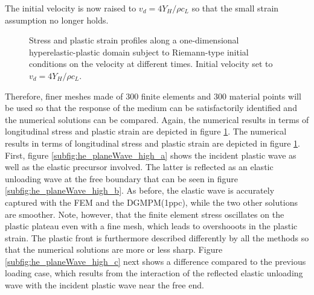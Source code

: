 The initial velocity is now raised to $v_d=4Y_H/\rho c_L$ so that the small strain assumption no longer holds.
\begin{figure}[h!]
  \centering
  {}
  {}
  {}
  {}
  {}
  {}
  {}
  {}
  {}
  
  
  
  \caption{Stress and plastic strain profiles along a one-dimensional hyperelastic-plastic domain subject to Riemann-type initial conditions on the velocity at different times. Initial velocity set to $v_d=4Y_H/\rho c_L$.
  }
  \label{fig:hep_planeWave_high}
\end{figure}
Therefore, finer meshes made of $300$ finite elements and $300$ material points will be used so that the response of the medium can be satisfactorily identified and the numerical solutions can be compared.
Again, the numerical results in terms of longitudinal stress and plastic strain are depicted in figure \ref{fig:hep_planeWave_high}.
The numerical results in terms of longitudinal stress and plastic strain are depicted in figure \ref{fig:hep_planeWave_high}.
First, figure \ref{subfig:he_planeWave_high_a} shows the incident plastic wave as well as the elastic precursor involved.
The latter is reflected as an elastic unloading wave at the free boundary that can be seen in figure \ref{subfig:he_planeWave_high_b}.
As before, the elastic wave is accurately captured with the FEM and the DGMPM(1ppc), while the two other solutions are smoother.
Note, however, that the finite element stress oscillates on the plastic plateau even with a fine mesh, which leads to overshooots in the plastic strain.
The plastic front is furthermore described differently by all the methods so that the numerical solutions are more or less sharp. 
%
Figure \ref{subfig:he_planeWave_high_c} next shows a difference compared to the previous loading case, which results from the interaction of the reflected elastic unloading wave with the incident plastic wave near the free end.
